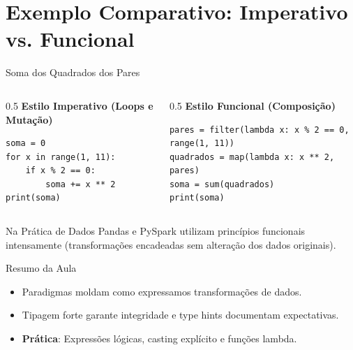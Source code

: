 \documentclass[aspectratio=169, 10pt]{beamer}
\begin{document}
\section{Exemplo Comparativo: Imperativo vs. Funcional}

\begin{frame}[fragile]{Soma dos Quadrados dos Pares}
  \begin{columns}
    \begin{column}{0.5\textwidth}
      \textbf{Estilo Imperativo (Loops e Mutação)}
      \begin{lstlisting}
soma = 0
for x in range(1, 11):
    if x % 2 == 0:
        soma += x ** 2
print(soma)
      \end{lstlisting}
    \end{column}
    \begin{column}{0.5\textwidth}
      \textbf{Estilo Funcional (Composição)}
      \begin{lstlisting}
pares = filter(lambda x: x % 2 == 0, range(1, 11))
quadrados = map(lambda x: x ** 2, pares)
soma = sum(quadrados)
print(soma)
      \end{lstlisting}
    \end{column}
  \end{columns}
  \begin{exampleblock}{Na Prática de Dados}
    Pandas e PySpark utilizam princípios funcionais intensamente (transformações encadeadas sem alteração dos dados originais).
  \end{exampleblock}
\end{frame}

\begin{frame}{Resumo da Aula}
  \begin{itemize}
    \item Paradigmas moldam como expressamos transformações de dados.
    \item Tipagem forte garante integridade e type hints documentam expectativas.
    \item \textbf{Prática}: Expressões lógicas, casting explícito e funções lambda.
  \end{itemize}
\end{frame}
\end{document}
